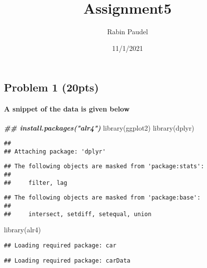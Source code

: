 \documentclass[
]{article}
\title{Assignment5}
\author{Rabin Paudel}
\date{11/1/2021}
\newenvironment{Shaded}{\begin{snugshade}}{\end{snugshade}}
\newcommand{\DocumentationTok}[1]{\textcolor[rgb]{0.56,0.35,0.01}{\textbf{\textit{#1}}}}
\newcommand{\FunctionTok}[1]{\textcolor[rgb]{0.00,0.00,0.00}{#1}}
\newcommand{\NormalTok}[1]{#1}
\begin{document}
\maketitle

\hypertarget{problem-1-20pts}{%
\subsection{Problem 1 (20pts)}\label{problem-1-20pts}}

\hypertarget{a-snippet-of-the-data-is-given-below}{%
\paragraph{A snippet of the data is given
below}\label{a-snippet-of-the-data-is-given-below}}

\begin{Shaded}
\begin{Highlighting}[]
\DocumentationTok{\#\# install.packages("alr4")}
\FunctionTok{library}\NormalTok{(ggplot2)}
\FunctionTok{library}\NormalTok{(dplyr)}
\end{Highlighting}
\end{Shaded}

\begin{verbatim}
## 
## Attaching package: 'dplyr'
\end{verbatim}

\begin{verbatim}
## The following objects are masked from 'package:stats':
## 
##     filter, lag
\end{verbatim}

\begin{verbatim}
## The following objects are masked from 'package:base':
## 
##     intersect, setdiff, setequal, union
\end{verbatim}

\begin{Shaded}
\begin{Highlighting}[]
\FunctionTok{library}\NormalTok{(alr4)}
\end{Highlighting}
\end{Shaded}

\begin{verbatim}
## Loading required package: car
\end{verbatim}

\begin{verbatim}
## Loading required package: carData
\end{verbatim}
\end{document}
